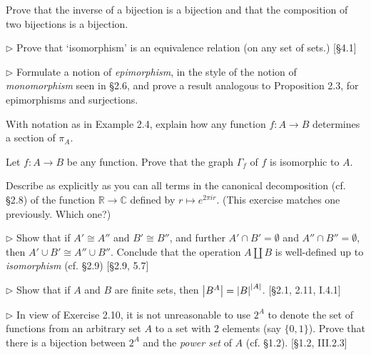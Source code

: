 \begin{problem}
  Prove that the inverse of a bijection is a bijection and that the
  composition of two bijections is a bijection.
\end{problem}

\begin{problem}
  $\rhd$ Prove that `isomorphism' is an equivalence relation (on any set
  of sets.) [\S4.1]
\end{problem}

\begin{problem}
  $\rhd$ Formulate a notion of \textit{epimorphism}, in the style
  of the notion of \textit{monomorphism} seen in \S 2.6, and prove a result
  analogous to Proposition 2.3, for epimorphisms and surjections.
\end{problem}

\begin{problem}
  With notation as in Example 2.4, explain how any function $f:A\to B$
  determines a section of $\pi_A$.
\end{problem}

\begin{problem}
  Let $f:A\to B$ be any function. Prove that the graph $\Gamma_f$ of $f$ is
  isomorphic to $A$.
\end{problem}

\begin{problem}
  Describe as explicitly as you can all terms in the canonical decomposition
  (cf. \S2.8) of the function $\mathbb{R}\to\mathbb{C}$ defined by $r\mapsto
  e^{2\pi ir}$. (This exercise matches one previously. Which one?)
\end{problem}

\begin{problem}
  $\rhd$ Show that if $A'\cong A''$ and $B'\cong B''$, and further
  $A'\cap B'=\emptyset$ and $A''\cap B''=\emptyset$, then
  $A'\cup B'\cong A''\cup B''$. Conclude that the operation $A\amalg B$
  is well-defined up to \textit{isomorphism} (cf. \S2.9) [\S2.9, 5.7]
\end{problem}

\begin{problem}
  $\rhd$ Show that if $A$ and $B$ are finite sets, then $\left|B^A\right| =
  \left|B\right|^{\left|A\right|}$. [\S2.1, 2.11, I.4.1]
\end{problem}

\begin{problem}
  $\rhd$ In view of Exercise 2.10, it is not unreasonable to use $2^A$ to
  denote the set of functions from an arbitrary set $A$ to a set with $2$
  elements (say $\{0,1\}$). Prove that there is a bijection between $2^A$
  and the \textit{power set} of $A$ (cf. \S1.2). [\S1.2, III.2.3]
\end{problem}

